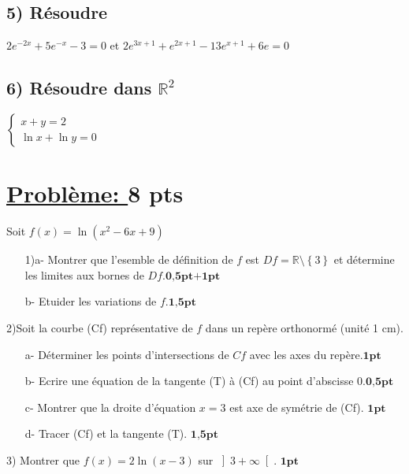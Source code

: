 \documentclass[12pt]{article}
\begin{document}
\subsection*{ 5) Résoudre } $2e^{-2x}+5e^{-x}-3=0$ et $2e^{3x+1}+e^{2x+1}-13e^{x+1}+6e=0$
\subsection*{ 6) Résoudre dans $\mathbb{R}^{2}$} 
\( \begin{cases}
x + y = 2 \\
\ln x + \ln y = 0
\end{cases}\)

\section*{\underline{Problème: }\textbf{8 pts}}
Soit $f(x)=\ln(x^{2}-6x+9)$
\begin{itemize}
\item[1)a-] Montrer que l'esemble de définition de $f$ est $Df=\mathbb{R}\setminus\left\lbrace 3 \right\rbrace $ et détermine les limites aux bornes de $Df$.$\textbf{0,5pt+1pt}$

\item[b-] Etuider les variations de $f$.$\textbf{1,5pt}$
\end{itemize}

2)Soit la courbe (Cf) représentative de $f$ dans un repère orthonormé (unité 1 cm).
\begin{itemize}
\item[a-]Déterminer les points d'intersections de $Cf$ avec les axes du repère.$\textbf{1pt}$

\item[b-]Ecrire une équation de la tangente (T) à (Cf) au point d'abscisse 0.$\textbf{0,5pt}$

\item[c-]Montrer que la droite d'équation $x=3$ est axe de  symétrie de (Cf). $\textbf{1pt}$

\item[d-]Tracer (Cf) et la tangente (T). $\textbf{1,5pt}$
\end{itemize}
3) Montrer que $f(x)=2\ln(x-3)$ sur $ \left]3 +\infty \right[ $. $\textbf{1pt}$
\end{document}
